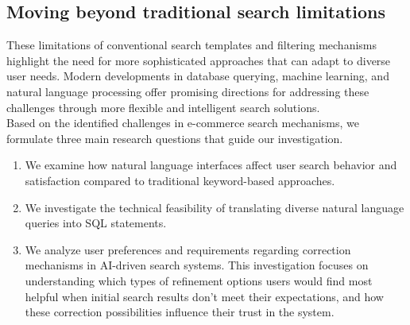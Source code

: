 \documentclass[../../submission.tex]{subfiles}
\begin{document}
\subsection{Moving beyond traditional search limitations}
These limitations of conventional search templates and filtering mechanisms highlight 
the need for more sophisticated approaches that can adapt to diverse user needs. 
Modern developments in database querying, machine learning, and natural language processing 
offer promising directions for addressing these challenges through more flexible and 
intelligent search solutions.\\
Based on the identified challenges in e-commerce search mechanisms, we formulate three main research 
questions that guide our investigation.
\begin{enumerate}
    \item We examine how natural language interfaces affect user search behavior and satisfaction 
    compared to traditional keyword-based approaches.
    \item We investigate the technical feasibility of translating diverse natural language queries into SQL statements.
    \item We analyze user preferences and requirements regarding correction mechanisms in AI-driven search systems. 
    This investigation focuses on understanding which types of refinement options users would find most helpful when 
    initial search results don't meet their expectations, and how these correction possibilities influence their trust 
    in the system.
\end{enumerate}
\end{document}
